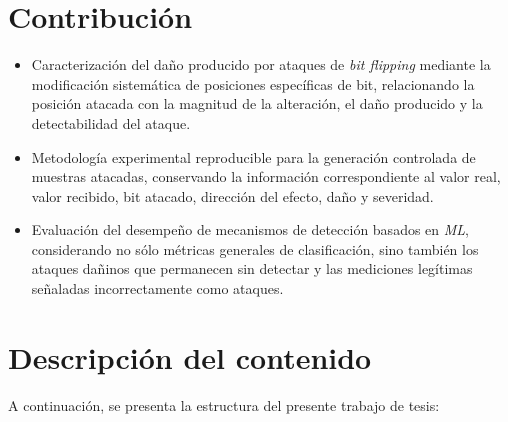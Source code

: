 \section{Contribución}

\begin{itemize}

    \item Caracterización del daño producido por ataques de \textit{bit flipping} mediante la modificación sistemática de posiciones específicas de bit, relacionando la posición atacada con la magnitud de la alteración, el daño producido y la detectabilidad del ataque.
    
    \item Metodología experimental reproducible para la generación controlada de muestras atacadas, conservando la información correspondiente al valor real, valor recibido, bit atacado, dirección del efecto, daño y severidad.
    
    \item Evaluación del desempeño de mecanismos de detección basados en \textit{ML}, considerando no sólo métricas generales de clasificación, sino también los ataques dañinos que permanecen sin detectar y las mediciones legítimas señaladas incorrectamente como ataques.

\end{itemize}

\section{Descripción del contenido}

A continuación, se presenta la estructura del presente trabajo de tesis:


